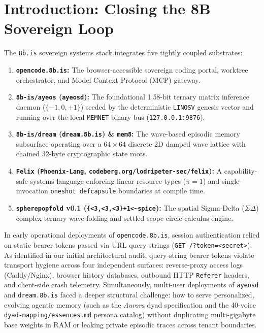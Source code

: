 \documentclass[10pt,twocolumn,letterpaper]{article}
\begin{document}
\section{Introduction: Closing the 8B Sovereign Loop}

The \texttt{8b.is} sovereign systems stack integrates five tightly coupled substrates:
\begin{enumerate}[leftmargin=1.4em,itemsep=1pt,topsep=2pt]
    \item \textbf{\texttt{opencode.8b.is}:} The browser-accessible sovereign coding portal, worktree orchestrator, and Model Context Protocol (MCP) gateway.
    \item \textbf{\texttt{8b-is/ayeos} (\texttt{ayeosd}):} The foundational 1.58-bit ternary matrix inference daemon ($\{-1,0,+1\}$) seeded by the deterministic \texttt{LINOSV} genesis vector and running over the local \texttt{MEMNET} binary bus (\texttt{127.0.0.1:9876}).
    \item \textbf{\texttt{8b-is/dream} (\texttt{dream.8b.is}) \& \texttt{mem8}:} The wave-based episodic memory subsurface operating over a $64\times 64$ discrete 2D damped wave lattice with chained 32-byte cryptographic state roots.
    \item \textbf{\texttt{Felix} (\texttt{Phoenix-Lang}, \texttt{codeberg.org/lodripeter-sec/felix}):} A capability-safe systems language enforcing linear resource types ($\pi=1$) and single-invocation \texttt{oneshot defcapsule} boundaries at compile time.
    \item \textbf{\texttt{spherepopfold} v0.1 (\texttt{\{<3,<3,<3\}+1<\textasciitilde spice}):} The spatial Sigma-Delta ($\Sigma\Delta$) complex ternary wave-folding and settled-scope circle-calculus engine.
\end{enumerate}

In early operational deployments of \texttt{opencode.8b.is}, session authentication relied on static bearer tokens passed via URL query strings (\texttt{GET /?token=<secret>}). As identified in our initial architectural audit, query-string bearer tokens violate transport hygiene across four independent surfaces: reverse-proxy access logs (Caddy/Nginx), browser history databases, outbound HTTP \texttt{Referer} headers, and client-side crash telemetry. Simultaneously, multi-user deployments of \texttt{ayeosd} and \texttt{dream.8b.is} faced a deeper structural challenge: how to serve personalized, evolving agentic memory (such as the \emph{Aurora} dyad specification and the 40-voice \texttt{dyad-mapping/essences.md} persona catalog) without duplicating multi-gigabyte base weights in RAM or leaking private episodic traces across tenant boundaries.
\end{document}
